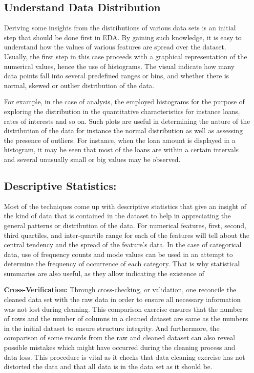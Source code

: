 \documentclass[12pt, a4paper,oneside]{book}
\numberwithin{equation}{section}
\begin{document}
\subsection{ Understand Data Distribution}

Deriving some insights from the distributions of various data sets is an initial step that should be done first in EDA. By gaining such knowledge, it is easy to understand how the values of various features are spread over the dataset. Usually, the first step in this case proceeds with a graphical representation of the numerical values, hence the use of histograms. The visual indicate how many data points fall into several predefined ranges or bins, and whether there is normal, skewed or outlier distribution of the data.

For example, in the case of analysis, the employed histograms for the purpose of exploring the distribution in the quantitative characteristics for instance loans, rates of interests and so on. Such plots are useful in determining the nature of the distribution of the data for instance the normal distribution as well as assessing the presence of outliers. For instance, when the loan amount is displayed in a histogram, it may be seen that most of the loans are within a certain intervals and several unusually small or big values may be observed. 


\vspace{7mm}
\subsection{Descriptive Statistics:}

Most of the techniques come up with descriptive statistics that give an insight of the kind of data that is contained in the dataset to help in appreciating the general patterns or distribution of the data. For numerical features, first, second, third quartiles, and inter-quartile range for each of the features will tell about the central tendency and the spread of the feature’s data. In the case of categorical data, use of frequency counts and mode values can be used in an attempt to determine the frequency of occurrence of each category. That is why statistical summaries are also useful, as they allow indicating the existence of 
 
\textbf{Cross-Verification:}
Through cross-checking, or validation, one reconcile the cleaned data set with the raw data in order to ensure all necessary information was not lost during cleaning. This comparison exercise ensures that the number of rows and the number of columns in a cleaned dataset are same as the numbers in the initial dataset to ensure structure integrity. And furthermore, the comparison of some records from the raw and cleaned dataset can also reveal possible mistakes which might have occurred during the cleaning process and data loss. This procedure is vital as it checks that data cleaning exercise has not distorted the data and that all data is in the data set as it should be. 
\end{document}
